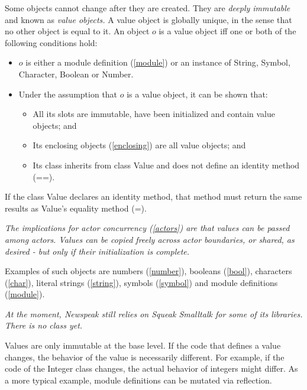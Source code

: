 \documentclass{article}
\newcommand{\code}[1]{{\sf #1}}
\begin{document}
Some objects cannot change after they are created. They are {\em deeply immutable} and known as {\em value objects.} A value object is globally unique, in the sense that no other object is equal to it. An object $o$ is a value object iff one or both of the following conditions hold:
\begin{itemize}
\item $o$ is either a module definition (\ref{module}) or an instance of \code{String}, \code{Symbol},  \code{Character}, \code{Boolean} or \code{Number}.
\item Under the assumption that $o$ is a value object, it can be shown that:
\begin{itemize}
\item All its slots are immutable, have been initialized and contain value objects; and
\item Its enclosing objects (\ref{enclosing}) are all value objects; and
\item Its class inherits from class \code{Value} and does not define an identity method (\code{==}).
\end{itemize}
\end{itemize}

If the class \code{Value} declares an identity method, that method must return the same results as \code{Value}'s equality method (\code{=}).

{\it
The implications for actor concurrency (\ref{actors}) are that values can be passed among actors.  Values can be copied freely across actor boundaries, or shared, as desired - but only if their initialization is complete.
}

Examples of such objects are numbers (\ref{number}), booleans (\ref{bool}), characters (\ref{char}), literal strings (\ref{string}), symbols (\ref{symbol}) and module definitions (\ref{module}).  

{\it
At the moment, Newspeak still relies on Squeak Smalltalk for some of its libraries. There is no class  yet.
}

Values are only immutable at the base level. If the code that defines a value changes, the behavior of the value is necessarily different. For example, if the code of the \code{Integer} class changes, the actual behavior of integers might differ. As a more typical example, module definitions can be mutated via reflection.
\end{document}
